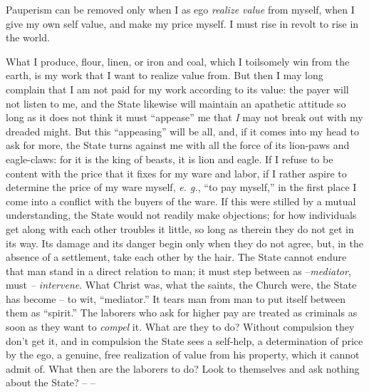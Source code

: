 \documentclass[12pt,a4paper]{book}
\begin{document}
Pauperism can be removed only when I as ego \textit{realize value} from 
myself, when I give my own self value, and make my price myself. I must rise 
in revolt to rise in the world.

What I produce, flour, linen, or iron and coal, which I toilsomely win from 
the earth, is my work that I want to realize value from. But then I may long 
complain that I am not paid for my work according to its value: the payer will 
not listen to me, and the State likewise will maintain an apathetic attitude 
so long as it does not think it must ``appease'' me that \textit{I} may not 
break out with my dreaded might. But this ``appeasing'' will be all, and, if 
it comes into my head to ask for more, the State turns against me with all the 
force of its lion-paws and eagle-claws: for it is the king of beasts, it is 
lion and eagle. If I refuse to be content with the price that it fixes for my 
ware and labor, if I rather aspire to determine the price of my ware myself, 
\textit{e. g.}, ``to pay myself,'' in the first place I come into a conflict 
with the buyers of the ware. If this were stilled by a mutual understanding, 
the State would not readily make objections; for how individuals get along 
with each other troubles it little, so long as therein they do not get in its 
way. Its damage and its danger begin only when they do not agree, but, in the 
absence of a settlement, take each other by the hair. The State cannot endure 
that man stand in a direct relation to man; it must step between as 
--\textit{mediator}, must \textit{-- intervene}. What Christ was, what the 
saints, the Church were, the State has become -- to wit, ``mediator.'' It 
tears man from man to put itself between them as ``spirit.'' The laborers 
who ask for higher pay are treated as criminals as soon as they want to 
\textit{compel} it. What are they to do? Without compulsion they don't get it, 
and in compulsion the State sees a self-help, a determination of price by the 
ego, a genuine, free realization of value from his property, which it cannot 
admit of. What then are the laborers to do? Look to themselves and ask nothing 
about the State? -- --
\end{document}
